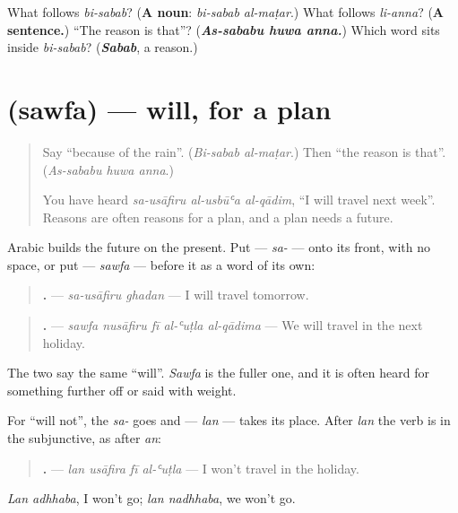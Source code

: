 \begin{tcolorbox}[breakable,colback=teal!4,colframe=teal!35!black,title={Before you move on}]
What follows \emph{bi-sabab}? (\textbf{A noun}: \emph{bi-sabab al-maṭar}.) What follows \emph{li-anna}? (\textbf{A sentence.}) \textquotedblleft{}The reason is that\textquotedblright{}? (\emph{\textbf{As-sababu huwa anna.}}) Which word sits inside \emph{bi-sabab}? (\emph{\textbf{Sabab}}, a reason.)
\end{tcolorbox}
\section[\texorpdfstring{\ar{سوف} (sawfa)}{سوف (sawfa)}]{ (sawfa) — will, for a plan}

\label{lesson:AR-C286-sawfa}



\begin{quote}
Say \textquotedblleft{}because of the rain\textquotedblright{}. (\emph{Bi-sabab al-maṭar}.) Then \textquotedblleft{}the reason is that\textquotedblright{}. (\emph{As-sababu huwa anna}.)

You have heard \emph{sa-usāfiru al-usbūʿa al-qādim}, \textquotedblleft{}I will travel next week\textquotedblright{}. Reasons are often reasons for a plan, and a plan needs a future.
\end{quote}

\begin{grammarlens}[title={Grammar Lens: sa- and sawfa}]
Arabic builds the future on the present. Put \textbf{} — \emph{sa-} — onto its front, with no space, or put \textbf{} — \emph{sawfa} — before it as a word of its own:

\begin{quote}
\textbf{ .} — \emph{sa-usāfiru ghadan} — I will travel tomorrow.
\end{quote}

\begin{quote}
\textbf{    .} — \emph{sawfa nusāfiru fī al-ʿuṭla al-qādima} — We will travel in the next holiday.
\end{quote}

The two say the same \textquotedblleft{}will\textquotedblright{}. \emph{Sawfa} is the fuller one, and it is often heard for something further off or said with weight.
\end{grammarlens}

\begin{grammarlens}[title={Grammar Lens: lan, will not}]
For \textquotedblleft{}will not\textquotedblright{}, the \emph{sa-} goes and \textbf{} — \emph{lan} — takes its place. After \emph{lan} the verb is in the subjunctive, as after \emph{an}:

\begin{quote}
\textbf{   .} — \emph{lan usāfira fī al-ʿuṭla} — I won't travel in the holiday.
\end{quote}

\emph{Lan adhhaba}, I won't go; \emph{lan nadhhaba}, we won't go.
\end{grammarlens}

